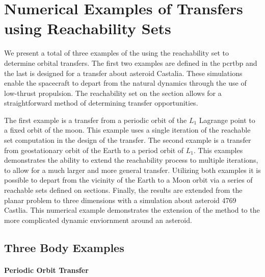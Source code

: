 \section{Numerical Examples of Transfers using Reachability Sets}\label{sec:simulation}

We present a total of three examples of the using the reachability set to determine orbital transfers.
The first two examples are defined in the \gls{pcrtbp} and the last is designed for a transfer about asteroid Castalia.
These simulations enable the spacecraft to depart from the natural dynamics through the use of low-thrust propulsion.
The reachability set on the \Poincare section allows for a straightforward method of determining transfer opportunities.

The first example is a transfer from a periodic orbit of the \( L_1 \) Lagrange point to a fixed orbit of the moon.
This example uses a single iteration of the reachable set computation in the design of the transfer.
The second example is a transfer from geostationary orbit of the Earth to a period orbit of \( L_1 \). 
This examples demonstrates the ability to extend the reachability process to multiple iterations, to allow for a much larger and more general transfer.
Utilizing both examples it is possible to depart from the vicinity of the Earth to a Moon orbit via a series of reachable sets defined on \Poincare sections.
Finally, the results are extended from the planar problem to three dimensions with a simulation about asteroid 4769 Castlia.
This numerical example demonstrates the extension of the method to the more complicated dynamic enviornment around an asteroid.

\subsection{Three Body Examples}

\paragraph{Periodic Orbit Transfer}\label{sec:periodic_orbit_transfer}

